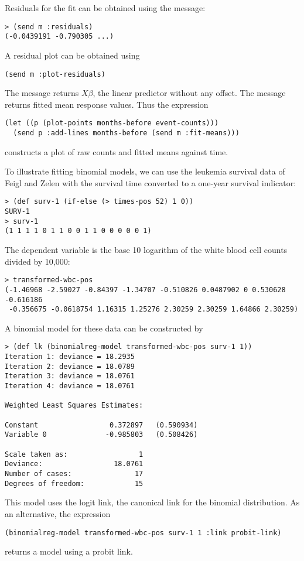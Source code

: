 Residuals for the fit can be obtained using the 
message:
\begin{verbatim}
> (send m :residuals)
(-0.0439191 -0.790305 ...)
\end{verbatim}
A residual plot can be obtained using
\begin{verbatim}
(send m :plot-residuals)
\end{verbatim}
The  message returns $X\beta$, the linear predictor
without any offset. The  message returns fitted mean
response values. Thus the expression
\begin{verbatim}
(let ((p (plot-points months-before event-counts)))
  (send p :add-lines months-before (send m :fit-means)))
\end{verbatim}
constructs a plot of raw counts and fitted means against time.

To illustrate fitting binomial models, we can use the leukemia survival
data of Feigl and Zelen \cite[Section 2.8.3]{LS} with the survival
time converted to a one-year survival indicator:
\begin{verbatim}
> (def surv-1 (if-else (> times-pos 52) 1 0))
SURV-1
> surv-1
(1 1 1 1 0 1 1 0 0 1 1 0 0 0 0 0 1)
\end{verbatim}
The dependent variable is the base 10 logarithm of the white blood
cell counts divided by 10,000:
\begin{verbatim}
> transformed-wbc-pos
(-1.46968 -2.59027 -0.84397 -1.34707 -0.510826 0.0487902 0 0.530628 -0.616186
 -0.356675 -0.0618754 1.16315 1.25276 2.30259 2.30259 1.64866 2.30259)
\end{verbatim}
A binomial model for these data can be constructed by
\begin{verbatim}
> (def lk (binomialreg-model transformed-wbc-pos surv-1 1))
Iteration 1: deviance = 18.2935
Iteration 2: deviance = 18.0789
Iteration 3: deviance = 18.0761
Iteration 4: deviance = 18.0761

Weighted Least Squares Estimates:

Constant                 0.372897   (0.590934)
Variable 0              -0.985803   (0.508426)

Scale taken as:                 1
Deviance:                 18.0761
Number of cases:               17
Degrees of freedom:            15
\end{verbatim}
This model uses the logit link, the canonical link for the binomial
distribution. As an alternative, the expression
\begin{verbatim}
(binomialreg-model transformed-wbc-pos surv-1 1 :link probit-link)
\end{verbatim}
returns a model using a probit link.

